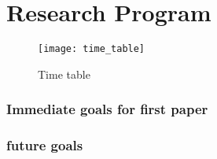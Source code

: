 \section{Research Program}

\begin{figure}[h]
	\centering
	\texttt{[image: time\_table]}
	\caption{Time table}
\end{figure}

\subsubsection*{Immediate goals for first paper}
\subsubsection*{future goals}